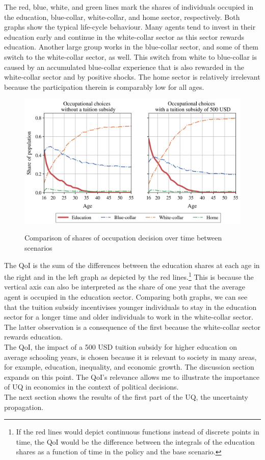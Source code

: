 The red, blue, white, and green lines mark the shares of individuals occupied in the education, blue-collar, white-collar, and home sector, respectively. Both graphs show the typical life-cycle behaviour. Many agents tend to invest in their education early and continue in the white-collar sector as this sector rewards education. Another large group works in the blue-collar sector, and some of them switch to the white-collar sector, as well. This switch from white to blue-collar is caused by an accumulated blue-collar experience that is also rewarded in the white-collar sector and by positive shocks. The home sector is relatively irrelevant because the participation therein is comparably low for all ages.
\begin{figure}[H]
	\caption{Comparison of shares of occupation decision over time between scenarios}
	\centering
	\includegraphics[scale=0.75]{../scrypy/figures/occ_choice_shares}
	\label{fig:paths}
\end{figure}
\noindent
The QoI is the sum of the differences between the education shares at each age in the right and in the left graph as depicted by the red lines.\footnote{If the red lines would depict continuous functions instead of discrete points in time, the QoI would be the difference between the integrals of the education shares as a function of time in the policy and the base scenario.} This is because the vertical axis can also be interpreted as the share of one year that the average agent is occupied in the education sector. Comparing both graphs, we can see that the tuition subsidy incentivises younger individuals to stay in the education sector for a longer time and older individuals to work in the white-collar sector. The latter observation is a consequence of the first because the white-collar sector rewards education.\\
\newline
The QoI, the impact of a 500 USD tuition subsidy for higher education on average schooling years, is chosen because it is relevant to society in many areas, for example, education, inequality, and economic growth. The discussion section expands on this point. The QoI's relevance allows me to illustrate the importance of UQ in economics in the context of political decisions.\\
\newline
The next section shows the results of the first part of the UQ, the uncertainty propagation.

